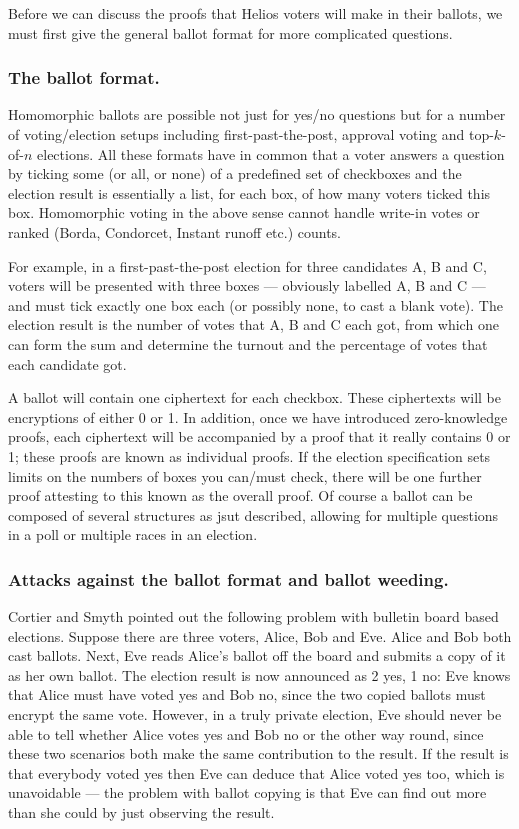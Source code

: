 \documentclass{llncs}
\begin{document}
Before we can discuss the proofs that Helios voters will make in their ballots,
we must first give the general ballot format for more complicated questions.

\subsubsection{The ballot format.}
Homomorphic ballots are possible not just for yes/no questions but for a number
of voting/election setups including first-past-the-post, approval voting and
top-$k$-of-$n$ elections. All these formats have in common that a voter answers
a question by ticking some (or all, or none) of a predefined set of checkboxes
and the election result is essentially a list, for each box, of how many voters
ticked this box.
Homomorphic voting in the above sense cannot handle write-in votes or ranked
(Borda, Condorcet, Instant runoff etc.) counts.

For example, in a first-past-the-post election for three candidates A, B and C,
voters will be presented with three boxes --- obviously labelled A, B and C ---
and must tick exactly one box each (or possibly none, to cast a blank vote). The
election result is the number of votes that A, B and C each got, from which one
can form the sum and determine the turnout and the percentage of votes that each
candidate got.

A ballot will contain one ciphertext for each checkbox. These
ciphertexts will be encryptions of either 0 or 1. In addition, once we have
introduced zero-knowledge proofs, each ciphertext will be accompanied by a proof
that it really contains 0 or 1; these proofs are known as individual proofs. If
the election specification sets limits on the numbers of boxes you can/must
check, there will be one further proof attesting to this known as the overall
proof. Of course a ballot can be composed of several structures as jsut
described, allowing for multiple questions in a poll or multiple races in an
election.

\subsubsection{Attacks against the ballot format and ballot weeding.}
Cortier and Smyth \cite{CS13} pointed out the following problem with bulletin
board based elections. Suppose there are three voters, Alice, Bob and Eve. Alice
and Bob both cast ballots. Next, Eve reads Alice's ballot off the board and
submits a copy of it as her own ballot. The election result is now announced as
2 yes, 1 no: Eve knows that Alice must have voted yes and Bob no, since the two
copied ballots must encrypt the same vote. However, in a truly private election,
Eve should never be able to tell whether Alice votes yes and Bob no or the other
way round, since these two scenarios both make the same contribution to the
result. If the result is that everybody voted yes then Eve can deduce that Alice
voted yes too, which is unavoidable --- the problem with ballot copying is that
Eve can find out more than she could by just observing the result.
\end{document}
